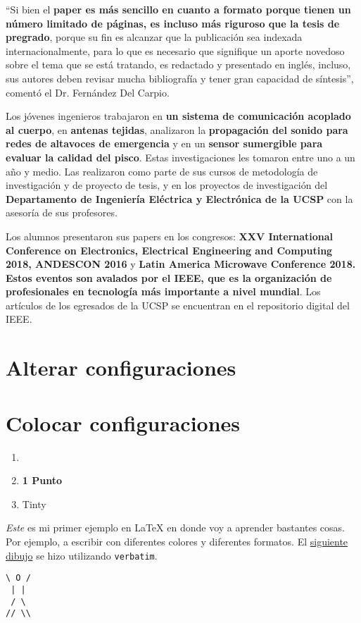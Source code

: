 \documentclass{article}
\begin{document}
“Si bien el {\bf paper es más sencillo en cuanto a formato porque tienen un número limitado de páginas, es incluso más riguroso que la tesis de pregrado}, porque su fin es alcanzar que la publicación sea indexada internacionalmente, para lo que es necesario que signifique un aporte novedoso sobre el tema que se está tratando, es redactado y presentado en inglés, incluso, sus autores deben revisar mucha bibliografía y tener gran capacidad de síntesis”, comentó el Dr. Fernández Del Carpio.

Los jóvenes ingenieros trabajaron en {\bf un sistema de comunicación acoplado al cuerpo}, en {\bf antenas tejidas}, analizaron la {\bf propagación del sonido para redes de altavoces de emergencia} y en un {\bf sensor sumergible para evaluar la calidad del pisco}. Estas investigaciones les tomaron entre uno a un año y medio. Las realizaron como parte de sus cursos de metodología de investigación y de proyecto de tesis, y en los proyectos de investigación del {\bf Departamento de Ingeniería Eléctrica y Electrónica de la UCSP} con la asesoría de sus profesores.

Los alumnos presentaron sus papers en los congresos: {\bf XXV International Conference on Electronics, Electrical Engineering and Computing 2018, ANDESCON 2016} y {\bf Latin America Microwave Conference 2018. Estos eventos son avalados por el IEEE, que es la organización de profesionales en tecnología más importante a nivel mundial}. Los artículos de los egresados de la UCSP se encuentran en el repositorio digital del IEEE.

\section{Alterar configuraciones}
\section{Colocar configuraciones}
\begin{enumerate}
	\item {}
	\item {\bf 1 Punto}
	\item {\sc Tinty}
\end{enumerate}
\begin{multicols}{2}
{\it Este} es mi {\tiny primer ejemplo} en {\Huge LaTeX} en donde voy a aprender
bastantes cosas. Por ejemplo, a escribir con {\blue diferentes} {\red colores} y diferentes {\sc formatos}. El \underline{siguiente dibujo}
se hizo utilizando {\tt verbatim}.
\begin{verbatim}
\ O /
 | |
 / \
// \\
\end{verbatim}
\end{multicols}
\end{document}
